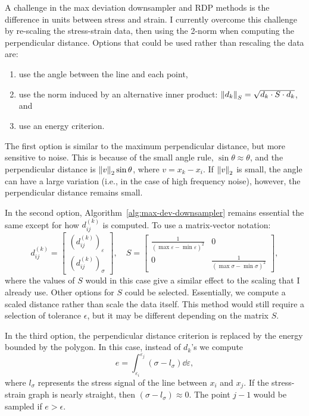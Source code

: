 \documentclass[a4paper,11pt]{article}
\begin{document}
A challenge in the max deviation downsampler and RDP methods is the difference in units between stress and strain.
I currently overcome this challenge by re-scaling the stress-strain data, then using the 2-norm when computing the perpendicular distance.
Options that could be used rather than rescaling the data are:
\begin{enumerate}
    \item use the angle between the line and each point,
    \item use the norm induced by an alternative inner product: $\norm{d_k}_S = \sqrt{d_k \cdot S \cdot d_k}$, and
    \item use an energy criterion.
\end{enumerate}

The first option is similar to the maximum perpendicular distance, but more sensitive to noise.
This is because of the small angle rule, $\sin \theta \approx \theta$, and the perpendicular distance is $\norm{v}_2 \sin \theta$, where $v = x_k - x_i$.
If $\norm{v}_2$ is small, the angle can have a large variation (i.e., in the case of high frequency noise), however, the perpendicular distance remains small.

In the second option, Algorithm~\ref{alg:max-dev-downsampler} remains essential the same except for how $d^{(k)}_{ij}$ is computed.
To use a matrix-vector notation:
\begin{equation*}
    d^{(k)}_{ij} = \begin{bmatrix}
        (d^{(k)}_{ij})_{\varepsilon} \\
        (d^{(k)}_{ij})_{\sigma}
    \end{bmatrix}, \quad
    S = \begin{bmatrix}
        \frac{1}{(\max \varepsilon - \min \varepsilon)^2} & 0 \\
        0 & \frac{1}{(\max \sigma - \min \sigma)^2}
    \end{bmatrix},
\end{equation*}
where the values of $S$ would in this case give a similar effect to the scaling that I already use.
Other options for $S$ could be selected.
Essentially, we compute a scaled distance rather than scale the data itself.
This method would still require a selection of tolerance $\epsilon$, but it may be different depending on the matrix $S$.

In the third option, the perpendicular distance criterion is replaced by the energy bounded by the polygon.
In this case, instead of $d_k$'s we compute
\begin{equation*}
    e = \int_{\varepsilon_i}^{\varepsilon_j} (\sigma - l_\sigma) \dd \varepsilon,
\end{equation*}
where $l_\sigma$ represents the stress signal of the line between $x_i$ and $x_j$.
If the stress-strain graph is nearly straight, then $(\sigma - l_\sigma) \approx 0$.
The point $j-1$ would be sampled if $e > \epsilon$.
\end{document}
